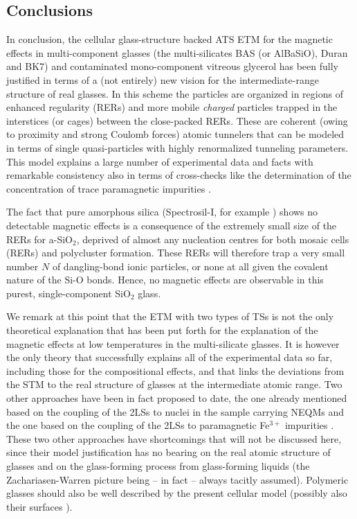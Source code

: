 \documentclass[10pt]{article}
\begin{document}
\subsection{Conclusions}
In conclusion, the cellular glass-structure backed ATS ETM for the magnetic effects 
in multi-component glasses (the multi-silicates BAS (or AlBaSiO), Duran and BK7) 
and contaminated mono-component vitreous glycerol has been fully justified in 
terms of a (not entirely) new vision for the intermediate-range structure of 
real glasses. In this scheme the particles are organized in regions of enhanced
regularity (RERs) and more mobile {\em charged} particles trapped in the 
interstices (or cages) between the close-packed RERs. These are coherent
(owing to proximity and strong Coulomb forces) atomic tunnelers that can be
modeled in terms of single quasi-particles with highly renormalized tunneling 
parameters. This model explains a large number of experimental data and facts 
with remarkable consistency also in terms of cross-checks like the 
determination of the concentration of trace paramagnetic impurities \cite{Bon2015}. 

The fact that pure amorphous silica (Spectrosil-I, for example \cite{Lud2003})
shows no detectable magnetic effects is a consequence of the extremely small
size of the RERs for a-SiO${}_2$, deprived of almost any nucleation centres
for both mosaic cells (RERs) and polycluster formation. These RERs will 
therefore trap a very small number $N$ of dangling-bond ionic particles, or
none at all given the covalent nature of the Si-O bonds. Hence, no magnetic
effects are observable in this purest, single-component SiO$_2$ glass. 

We remark at this point that the ETM with two types of TSs is not the only 
theoretical explanation that has been put forth for the explanation of the magnetic
effects at low temperatures in the multi-silicate glasses. It is however the only 
theory that successfully explains all of the experimental data so far, including those
for the compositional effects, and that links the deviations from the STM to the 
real structure of glasses at the intermediate atomic range. Two other approaches 
have been in fact proposed to date, the one already mentioned based on the 
coupling of the 2LSs to nuclei in the sample carrying NEQMs \cite{Wur2002} and 
the one based on the coupling of the 2LSs to paramagnetic Fe$^{3+}$ impurities 
\cite{Bor2007,Bor2011}. These two other approaches have shortcomings that will 
not be discussed here, since their model justification has no bearing on the real 
atomic structure of glasses and on the glass-forming process from glass-forming 
liquids (the Zachariasen-Warren picture being -- in fact -- always tacitly assumed). 
Polymeric glasses should also be well described by the present cellular model 
(possibly also their surfaces \cite{Koi2017}).   
\end{document}
